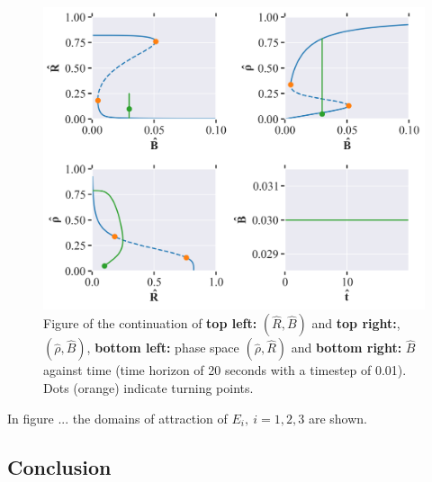 \begin{figure}[H]
    \centering
    \includegraphics[width= \textwidth]{figures/cell_biology_R0=0.3_rho0=0.16_deltaR=1_n=4_Bmax=0.04_eps=0.0.png}
    \caption{Figure of the continuation of \textbf{top left:} $(\hat{R}, \hat{B})$ and \textbf{top right:}, $(\hat{\rho}, \hat{B})$, \textbf{bottom left:} phase space $(\hat{\rho}, \hat{R})$ and 
    \textbf{bottom right:} $\hat{B}$ against time (time horizon of 20 seconds with a timestep of 0.01). Dots (orange) indicate turning points.}
    \label{fig:cell_biology_ex1}
\end{figure}

In figure ... the domains of attraction of $E_i, \ i = 1,2,3$ are shown.

\subsection{Conclusion}
